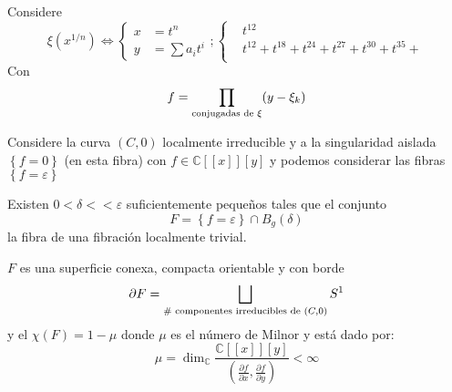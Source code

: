 \documentclass[12pt]{report}
\newcounter{it}
\theoremstyle{largebreak}
\begin{document}
    \begin{exa}
        Considere
        \begin{equation*}
            \xi(x^{ 1/n})\iff\left\{
                \begin{split}
                    x & = t^n\\
                    y & = \sum a_it^i
                \end{split}
             \right.;
             \left\{
                \begin{split}
                    & t^{ 12} \\
                    & t^{ 12}+t^{ 18}+t^{ 24}+t^{ 27}+t^{ 30}+t^{ 35}+ \\
                \end{split}
             \right.
        \end{equation*}
        Con
        \begin{equation*}
            f=\prod_{ \textup{conjugadas de }\xi}(y-\xi_k)
        \end{equation*}
    \end{exa}

    Considere la curva $(C,0)$ localmente irreducible y a la singularidad aislada $\left\{f=0 \right\}$ (en esta fibra) con $f\in\mathbb{C}[[x]][y]$ y podemos considerar las fibras $\left\{f=\varepsilon \right\}$

    \begin{theor}
        Existen $0<\delta<<\varepsilon$ suficientemente pequeños tales que el conjunto
        \begin{equation*}
            F=\left\{f=\varepsilon \right\}\cap B_g(\delta)
        \end{equation*}
        la fibra de una fibración localmente trivial.
    \end{theor}

    $F$ es una superficie conexa, compacta orientable y con borde
    \begin{equation*}
        \partial F=\bigsqcup_{ \textup{\# componentes irreducibles de }(C,0)}S^1 
    \end{equation*}
    y el $\chi(F)=1-\mu$ donde $\mu$ es el número de Milnor y está dado por:
    \begin{equation*}
        \mu=\dim_{\mathbb{C}}\frac{\mathbb{C}[[x]][y]}{\left(\frac{\partial f}{\partial x},\frac{\partial f}{\partial y} \right)}<\infty
    \end{equation*}
\end{document}
